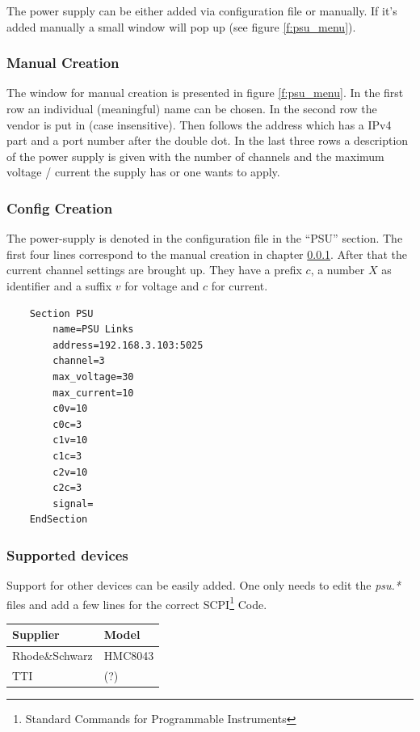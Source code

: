 \documentclass[10pt,a4paper]{article}
\begin{document}
	The power supply can be either added via configuration file or manually. If it's added manually a small window will pop up (see figure \ref{f:psu_menu}). 
	
	\subsubsection{Manual Creation}	
	\label{c:psu_manual_creation}
	
	The window for manual creation is presented in figure \ref{f:psu_menu}. In the first row an individual (meaningful) name can be chosen. In the second row the vendor is put in (case insensitive). Then follows the address which has a IPv4 part and a port number after the double dot. In the last three rows a description of the power supply is given with the number of channels and the maximum voltage / current the supply has or one wants to apply.	
	
	\subsubsection{Config Creation}
	
	The power-supply is denoted in the configuration file in the \enquote{PSU} section. The first four lines correspond to the manual creation in chapter \ref{c:psu_manual_creation}. After that the current channel settings are brought up. They have a prefix $c$, a number $X$ as identifier and a suffix $v$ for voltage and $c$ for current.
	
	\begin{lstlisting}
	Section PSU
		name=PSU Links
		address=192.168.3.103:5025
		channel=3
		max_voltage=30
		max_current=10
		c0v=10
		c0c=3
		c1v=10
		c1c=3
		c2v=10
		c2c=3
		signal=
	EndSection
	\end{lstlisting}
	
		\subsubsection{Supported devices}
		Support for other devices can be easily added. One only needs to edit the \textit{psu.*} files and add a few lines for the correct SCPI\footnote{Standard Commands for Programmable Instruments} Code.
	
		\begin{table}[H]
		\centering
		\begin{tabular}{ll}
		\toprule
		Supplier			& Model \\ \midrule
		Rhode\&Schwarz		& HMC8043 \\
		TTI					& (?) \\
		\bottomrule
		\end{tabular}			
		\end{table}	
	
\end{document}
